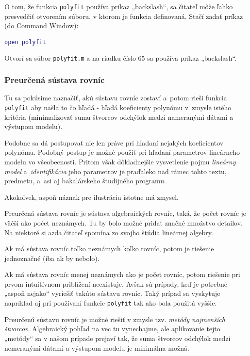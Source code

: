 \documentclass[a4paper, 10pt, ]{article}
\begin{document}
O tom, že funkcia \verb|polyfit| používa príkaz „backslash“, sa čitateľ môže ľahko presvedčiť otvorením súboru, v ktorom je funkcia definovaná. Stačí zadať príkaz (do Command Window):
\begin{lstlisting}[language=Matlab,]
open polyfit
\end{lstlisting}
Otvorí sa súbor \verb|polyfit.m| a na riadku číslo 65 sa používa príkaz „backslash“.






\subsubsection{Preurčená sústava rovníc}

Tu sa pokúsime naznačiť, akú sústavu rovníc zostaví a~potom rieši funkcia \verb|polyfit| aby našla to čo hľadá - hľadá koeficienty polynómu v~zmysle istého kritéria (minimalizovať sumu štvorcov odchýlok medzi nameranými dátami a výstupom modelu).

Podobne sa dá postupovať nie len práve pri hľadaní nejakých koeficientov polynómu. Podobný postup je možné použiť pri hľadaní parametrov lineárneho modelu vo všeobecnosti. Pritom však dôkladnejšie vysvetlenie pojmu \emph{lineárny model} a~\emph{identifikácia} jeho parametrov je praďaleko nad rámec tohto textu, predmetu, a~asi aj bakalárskeho študijného programu.

Akokoľvek, aspoň náznak pre ilustráciu istotne má zmysel.


Preurčená sústava rovníc je sústava algebraických rovníc, taká, že počet rovníc je väčší ako počet neznámych. Tu by bolo možné pridať značné množstvo detailov. Na niektoré si azda čitateľ spomína zo svojho štúdia lineárnej algebry.

Ak má sústava rovníc toľko neznámych koľko rovníc, potom je riešenie jednoznačné (iba ak by nebolo).

Ak má sústava rovníc menej neznámych ako je počet rovníc, potom riešenie pri prvom intuitívnom priblížení neexistuje. Avšak sú prípady, keď je potrebné „aspoň nejako“ vyriešiť takúto sústavu rovníc. Taký prípad sa vyskytuje napríklad aj pri používaní funkcie \verb|polyfit| tak ako bola použitá vyššie.

Preurčenú sústavu rovníc je možné riešiť v zmysle tzv. \emph{metódy najmenších štvorcov}. Algebraický pohľad na vec tu vynechajme, ale aplikovanie tejto „metódy“ sa v našom prípade prejaví tak, že suma štvorcov odchýlok medzi nemeranými dátami a výstupom modelu je minimálna možná.
\end{document}
